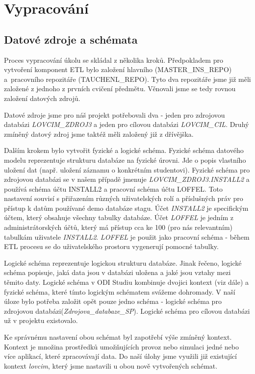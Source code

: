 \section{Vypracování}

\subsection{Datové zdroje a schémata}

Proces vypracování úkolu se skládal z několika kroků.
Předpokladem pro vytvoření komponent ETL bylo založení hlavního (MASTER\_INS\_REPO) a~pracovního repozitáře (TAUCHENL\_REPO).
Tyto dva repozitáře jsme již měli založené z jednoho z prvních cvičení předmětu.
Věnovali jsme se tedy rovnou založení datových zdrojů.

Datové zdroje jsme pro náš projekt potřebovali dva - jeden pro zdrojovou databázi \textit{LOVCIM\_ZDROJ3} a jeden pro cílovou databázi \textit{LOVCIM\_CIL}.
Druhý zmíněný datový zdroj jsme taktéž měli založený již z dřívějška.

Dalším krokem bylo vytvořit fyzické a logické schéma.
Fyzické schéma datového modelu reprezentuje strukturu databáze na fyzické úrovni.
Jde o popis vlastního uložení dat (např. uložení záznamu o konkrétním studentovi).
Fyzické schéma pro zdrojovou databázi se v našem případě jmenuje \textit{LOVCIM\_ZDROJ3.INSTALL2} a používá schéma účtu INSTALL2 a pracovní schéma účtu LOFFEL.
Toto nastavení souvisí s přiřazením různých uživatelských rolí a příslušných práv pro přístup k datům používané demo databáze stagu.
Účet \textit{INSTALL2} je specifickým účtem, který obsahuje všechny tabulky databáze.
Účet \textit{LOFFEL} je jedním z administrátorských účtů, který má přístup cca ke 100 (pro nás relevantním) tabulkám uživatele \textit{INSTALL2}.
\textit{LOFFEL} je použit jako pracovní schéma - během ETL procesu se do uživatelského prostoru vygenerují pomocné tabulky.

Logické schéma reprezentuje logickou strukturu databáze.
Jinak řečeno, logické schéma popisuje, jaká data jsou v databázi uložena a jaké jsou vztahy mezi těmito daty.
Logické schéma v ODI Studiu kombinuje dvojici kontext (viz dále) a fyzické schéma, které tímto logickým schématem svážeme dohromady.
V naší úloze bylo potřeba založit opět pouze jedno schéma - logické schéma pro zdrojovou databázi(\textit{Zdrojova\_databaze\_SP}).
Logické schéma pro cílovou databázi už v projektu existovalo.

Ke správnému nastavení obou schémat byl zapotřebí výše zmíněný kontext.
Kontext je množina prostředků umožňujících provoz nebo simulaci jedné nebo více aplikací, které zpracovávají data.
Do naší úlohy jsme využili již existující kontext \textit{lovcim}, který jsme nastavili u obou nově vytvořených schémat.

